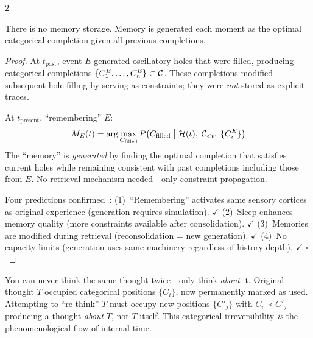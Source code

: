 \begin{multicols}{2}

\begin{theorem}
\label{thm:memory_generation}
There is no memory storage.  Memory is generated each moment as the
optimal categorical completion given all previous completions.
\end{theorem}

\begin{proof}
At $t_{\text{past}}$, event $E$ generated oscillatory holes that were filled,
producing categorical completions $\{C_1^E,\ldots,C_n^E\} \subset \mathcal{C}$.
These completions modified subsequent hole-filling by serving as constraints;
they were \emph{not} stored as explicit traces.

At $t_{\text{present}}$, ``remembering'' $E$:
\begin{equation}
M_E(t) = \arg\max_{C_{\text{filled}}} P\!\left(C_{\text{filled}}
  \;\middle|\; \mathcal{H}(t),\;\mathcal{C}_{<t},\;\{C_i^E\}\right)
\end{equation}
The ``memory'' is \emph{generated} by finding the optimal completion that
satisfies current holes while remaining consistent with past completions
including those from $E$.  No retrieval mechanism needed---only constraint
propagation.

Four predictions confirmed~\citep{mechelli2004price,stickgold2005sleep,
nader2000reconsolidation}:
(1)~``Remembering'' activates same sensory cortices as original experience
(generation requires simulation). $\checkmark$
(2)~Sleep enhances memory quality (more constraints available after
consolidation). $\checkmark$
(3)~Memories are modified during retrieval (reconsolidation = new generation). $\checkmark$
(4)~No capacity limits (generation uses same machinery regardless of history
depth). $\checkmark$
$\square$
\end{proof}

\begin{corollary}
\label{cor:no_rethinking}
You can never think the same thought twice---only think \emph{about} it.
Original thought $T$ occupied categorical positions $\{C_i\}$, now
permanently marked as used.  Attempting to ``re-think'' $T$ must occupy new
positions $\{C'_j\}$ with $C_i \prec C'_j$---producing a thought \emph{about}
$T$, not $T$ itself.  This categorical irreversibility \emph{is} the
phenomenological flow of internal time.
\end{corollary}

\end{multicols}

